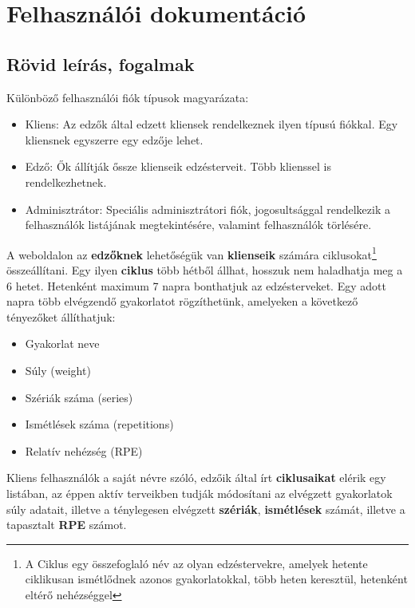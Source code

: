 \chapter{Felhasználói dokumentáció}
\label{ch:user}

\section{Rövid leírás, fogalmak}

Különböző felhasználói fiók típusok magyarázata:

\begin{itemize}
  \item Kliens: Az edzők által edzett kliensek rendelkeznek ilyen típusú fiókkal. Egy kliensnek egyszerre egy edzője lehet.
  \item Edző: Ők állítják őssze klienseik edzésterveit. Több klienssel is rendelkezhetnek.
  \item Adminisztrátor: Speciális adminisztrátori fiók, jogosultsággal rendelkezik a felhasználók listájának megtekintésére, valamint felhasználók törlésére. 
\end{itemize}

\bigskip

A weboldalon az \textbf{edzőknek} lehetőségük van \textbf{klienseik} számára ciklusokat\footnote[1]{A Ciklus egy összefoglaló név az olyan edzéstervekre, amelyek hetente ciklikusan ismétlődnek azonos gyakorlatokkal, több heten keresztül, hetenként eltérő nehézséggel} összeállítani. Egy ilyen \textbf{ciklus} több hétből állhat, hosszuk nem haladhatja meg a 6 hetet. Hetenként maximum 7 napra bonthatjuk az edzésterveket.
Egy adott napra több elvégzendő gyakorlatot rögzíthetünk, amelyeken a következő tényezőket állíthatjuk:
\begin{itemize}
  \item Gyakorlat neve
  \item Súly (weight)
  \item Szériák száma (series)
  \item Ismétlések száma (repetitions)
  \item Relatív nehézség (RPE)
\end{itemize}

\bigskip

Kliens felhasználók a saját névre szóló, edzőik által írt \textbf{ciklusaikat} elérik egy listában, az éppen aktív terveikben tudják módosítani az elvégzett gyakorlatok súly adatait, illetve a ténylegesen elvégzett \textbf{szériák}, \textbf{ismétlések} számát, illetve a tapasztalt \textbf{RPE} számot.

